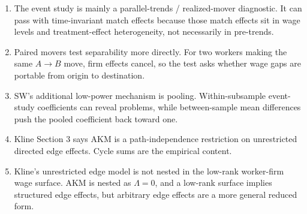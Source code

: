 ﻿\documentclass[11pt]{article}
\newcommand{\1}{\mathbf{1}}
\begin{document}
\begin{enumerate}
\item The event study is mainly a parallel-trends / realized-mover diagnostic. It can
pass with time-invariant match effects because those match effects sit in wage levels
and treatment-effect heterogeneity, not necessarily in pre-trends.

\item Paired movers test separability more directly. For two workers making the same
$A\to B$ move, firm effects cancel, so the test asks whether wage gaps are portable
from origin to destination.

\item SW's additional low-power mechanism is pooling. Within-subsample event-study
coefficients can reveal problems, while between-sample mean differences push the
pooled coefficient back toward one.

\item Kline Section 3 says AKM is a path-independence restriction on unrestricted
directed edge effects. Cycle sums are the empirical content.

\item Kline's unrestricted edge model is not nested in the low-rank worker-firm wage
surface. AKM is nested as $\Lambda=0$, and a low-rank surface implies structured
edge effects, but arbitrary edge effects are a more general reduced form.
\end{enumerate}
\end{document}
